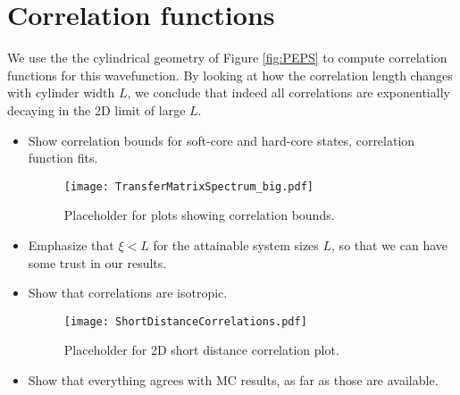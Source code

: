 
\section{Correlation functions}

We use the the cylindrical geometry of Figure \ref{fig:PEPS} to compute correlation functions for this wavefunction. By looking at how the correlation length changes with cylinder width $L$, we conclude that indeed all correlations are exponentially decaying in the 2D limit of large $L$. 

\begin{itemize}
\item Show correlation bounds for soft-core and hard-core states, correlation function fits.

\begin{figure}[H]
	\centering
	\texttt{[image: TransferMatrixSpectrum\_big.pdf]}
	\caption{Placeholder for plots showing correlation bounds.}
	\label{fig:TMS}
\end{figure}

\item Emphasize that $\xi < L$ for the attainable system sizes $L$, so that we can have some trust in our results.
\item Show that correlations are isotropic.

\begin{figure}[H]
	\centering
	\texttt{[image: ShortDistanceCorrelations.pdf]}
	\caption{Placeholder for 2D short distance correlation plot.}
	\label{fig:ShortCorr}
\end{figure}

\item Show that everything agrees with MC results, as far as those are available.
\end{itemize}


